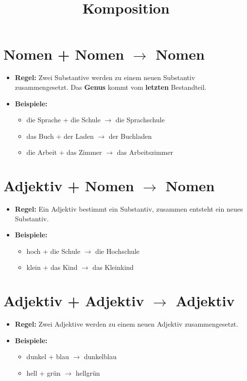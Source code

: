 \documentclass[a4paper]{article}
\title{Komposition}
\date{}
\begin{document}
    \maketitle
    
    
    \section{Nomen + Nomen \texorpdfstring{$\rightarrow$}{->} Nomen}
        \begin{itemize}
            \item \textbf{Regel:} Zwei Substantive werden zu einem neuen Substantiv zusammengesetzt. Das \textbf{Genus} kommt vom \textbf{letzten} Bestandteil.
            \item \textbf{Beispiele:}
            \begin{itemize}
                \item die Sprache + die Schule $\rightarrow$ die Sprachschule
                \item das Buch + der Laden $\rightarrow$ der Buchladen
                \item die Arbeit + das Zimmer $\rightarrow$ das Arbeitszimmer
            \end{itemize}
        \end{itemize}
    
    
    \section{Adjektiv + Nomen \texorpdfstring{$\rightarrow$}{->} Nomen}
        \begin{itemize}
            \item \textbf{Regel:} Ein Adjektiv bestimmt ein Substantiv, zusammen entsteht ein neues Substantiv.
            \item \textbf{Beispiele:}
            \begin{itemize}
                \item hoch + die Schule $\rightarrow$ die Hochschule
                \item klein + das Kind $\rightarrow$ das Kleinkind
            \end{itemize}
        \end{itemize}
    
    
    \section{Adjektiv + Adjektiv \texorpdfstring{$\rightarrow$}{->} Adjektiv}
        \begin{itemize}
            \item \textbf{Regel:} Zwei Adjektive werden zu einem neuen Adjektiv zusammengesetzt.
            \item \textbf{Beispiele:}
            \begin{itemize}
                \item dunkel + blau $\rightarrow$ dunkelblau
                \item hell + grün $\rightarrow$ hellgrün
            \end{itemize}
        \end{itemize}
    
\end{document}

